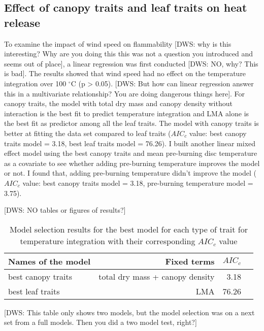 \documentclass[12pt]{report}
\begin{document}
\subsection{Effect of canopy traits and leaf traits on heat release}
To examine the impact of wind speed on flammability [DWS: why is this interesting? Why are you doing this this was not a question you introduced and seems out of place], a linear regression was first conducted [DWS: NO, why? This is bad]. The results showed that wind speed had no effect on the temperature integration over 100 $^{\circ}$C (p > 0.05). [DWS: But how can linear regression answer this in a multivariate relationship? You are doing dangerous things here]. For canopy traits, the model with total dry mass and canopy density without interaction is the best fit to predict temperature integration and \MakeUppercase{lma} alone is the best fit as predictor among all the leaf traits. The model with canopy traits is better at fitting the data set compared to leaf traits ($AIC_{c}$ value: best canopy traits model = 3.18, best leaf traits model = 76.26). I built another linear mixed effect model using the best canopy traits and mean pre-burning disc temperature as a covariate to see whether adding pre-burning temperature improves the model or not. I found that, adding pre-burning temperature didn't improve the model ($AIC_{c}$ value: best canopy traits model = 3.18, pre-burning temperature model = 3.75).


[DWS: NO tables or figures of results?]


\begin{table}
\centering
\begin{tabular}{lrrr}
       \hline
       \textbf{ Names of the model} & \textbf{ Fixed terms} & \textbf{$AIC_{c}$} \\
       \hline
        best canopy traits  & total dry mass + canopy density &  3.18 \\
       \hline
        best leaf traits    & LMA & 76.26 \\
       \hline
\end{tabular}
\caption{Model selection results for the best model for each type of trait for temperature integration with their corresponding $AIC_{c}$ value}
\end{table}

[DWS: This table only shows two models, but the model selection was on a next set from a full models. Then you did a two model test, right?]
\end{document}
